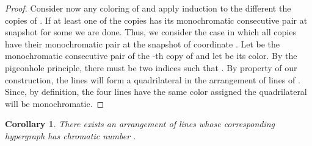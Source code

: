 \documentclass[11pt,a4paper]{article}
\newtheorem{corollary}[theorem]{Corollary}
\begin{document}
\begin{proof}
Consider now any coloring of  and apply induction to the different the copies of . If at least one of the copies has its monochromatic consecutive pair at snapshot  for some  we are done. Thus, we consider the case in which all copies have their monochromatic pair at the snapshot of coordinate . Let  be the monochromatic consecutive pair of the -th copy of  and let  be its color. By the pigeonhole principle, there must be two indices  such that . By property  of our construction, the lines  will form a quadrilateral in the arrangement of lines of . Since, by definition, the four lines have the same color assigned the quadrilateral will be monochromatic.
\end{proof}
\begin{corollary}
\label{UB:chrom}
There exists an arrangement of  lines whose corresponding hypergraph   has chromatic number .
\end{corollary}
\fi
\end{document}
